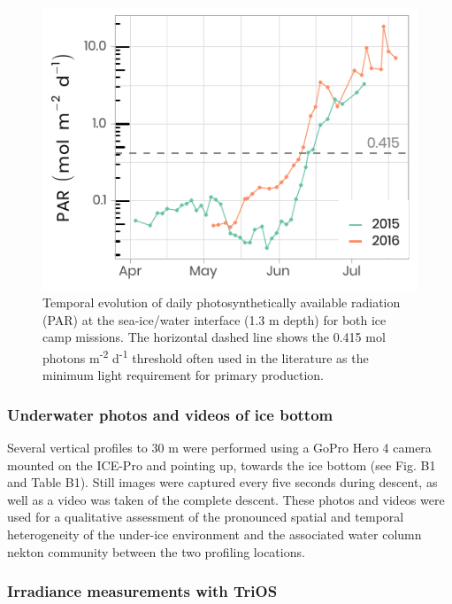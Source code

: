 \documentclass[essd, manuscript]{copernicus}
\begin{document}
\begin{figure}[H]
	\centering
	\includegraphics[scale = 1]{../../../graphs/fig05.pdf}
	\caption{Temporal evolution of daily photosynthetically available radiation (PAR) at the sea-ice/water interface (1.3 m depth) for both ice camp missions. The horizontal dashed line shows the 0.415 mol photons m\textsuperscript{-2} d\textsuperscript{-1} threshold often used in the literature as the minimum light requirement for primary production.}
\end{figure}

\subsubsection{Underwater photos and videos of ice bottom}

Several vertical profiles to 30 m were performed using a GoPro Hero 4 camera mounted on the ICE-Pro and pointing up, towards the ice bottom (see Fig. B1 and Table B1). Still images were captured every five seconds during descent, as well as a video was taken of the complete descent. These photos and videos were used for a qualitative assessment of the pronounced spatial and temporal heterogeneity of the under-ice environment and the associated water column nekton community between the two profiling locations.

\subsubsection{Irradiance measurements with TriOS}
\end{document}
